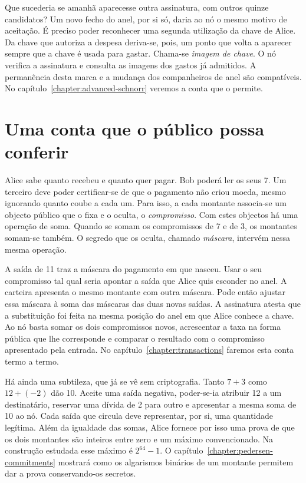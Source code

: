 Que sucederia se amanhã aparecesse outra assinatura, com outros quinze
candidatos? Um novo fecho do anel, por si só, daria ao nó o mesmo
motivo de aceitação. É preciso poder reconhecer uma segunda utilização
da chave de Alice. Da chave que autoriza a despesa deriva-se, pois, um
ponto que volta a aparecer sempre que a chave é usada para gastar.
Chama-se \emph{imagem de chave}. O nó verifica a assinatura e consulta
as imagens dos gastos já admitidos. A permanência desta marca e a
mudança dos companheiros de anel são compatíveis. No
capítulo~\ref{chapter:advanced-schnorr} veremos a conta que o permite.

\section{Uma conta que o público possa conferir}
\label{sec:goals}

Alice sabe quanto recebeu e quanto quer pagar. Bob poderá ler os seus
7. Um terceiro deve poder certificar-se de que o pagamento não criou
moeda, mesmo ignorando quanto coube a cada um. Para isso, a cada
montante associa-se um objecto público que o fixa e o oculta,
o \emph{compromisso}. Com estes objectos há uma operação de soma.
Quando se somam os compromissos de 7 e de 3, os montantes somam-se
também. O segredo que os oculta, chamado \emph{máscara}, intervém nessa
mesma operação.

A saída de 11 traz a máscara do pagamento em que nasceu. Usar o seu
compromisso tal qual seria apontar a saída que Alice quis esconder
no anel. A carteira apresenta o mesmo montante com outra máscara.
Pode então ajustar essa máscara à soma das máscaras das duas novas
saídas. A assinatura atesta que a substituição foi feita na mesma
posição do anel em que Alice conhece a chave. Ao nó basta somar os
dois compromissos novos, acrescentar a taxa na forma pública que lhe
corresponde e comparar o resultado com o compromisso apresentado pela
entrada. No capítulo~\ref{chapter:transactions} faremos esta conta
termo a termo.

Há ainda uma subtileza, que já se vê sem criptografia. Tanto
\(7+3\) como \(12+(-2)\) dão 10. Aceite uma saída negativa,
poder-se-ia atribuir 12 a um destinatário, reservar uma dívida de 2
para outro e apresentar a mesma soma de 10 ao nó. Cada saída que
circula deve representar, por si, uma quantidade legítima. Além da
igualdade das somas, Alice fornece por isso uma prova de que os dois
montantes são inteiros entre zero e um máximo convencionado. Na
construção estudada esse máximo é \(2^{64}-1\). O
capítulo~\ref{chapter:pedersen-commitments} mostrará como os algarismos
binários de um montante permitem dar a prova conservando-os secretos.

